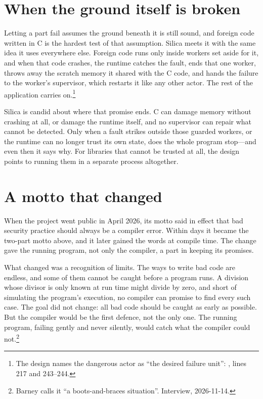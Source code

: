 \section{When the ground itself is broken}

Letting a part fail assumes the ground beneath it is still sound, and foreign
code written in C is the hardest test of that assumption. Silica meets it with
the same idea it uses everywhere else. Foreign code runs only inside workers set
aside for it, and when that code crashes, the runtime catches the fault, ends
that one worker, throws away the scratch memory it shared with the C code, and
hands the failure to the worker's supervisor, which restarts it like any other
actor. The rest of the application carries on.\footnote{The design names the
dangerous actor as ``the desired failure unit'':
, lines
217 and 243--244.}

Silica is candid about where that promise ends. C can damage memory without
crashing at all, or damage the runtime itself, and no supervisor can repair
what cannot be detected. Only when a fault strikes outside those guarded
workers, or the runtime can no longer trust its own state, does the whole
program stop---and even then it says why. For libraries that cannot be trusted
at all, the design points to running them in a separate process altogether.


\section{A motto that changed}

When the project went public in April 2026, its motto said in effect that bad
security practice should always be a compiler error. Within days it became the
two-part motto above, and it later gained the words at compile time. The change
gave the running program, not only the compiler, a part in keeping its
promises.

What changed was a recognition of limits. The ways to write bad code are
endless, and some of them cannot be caught before a program runs. A division
whose divisor is only known at run time might divide by zero, and short of
simulating the program's execution, no compiler can promise to find every such
case. The goal did not change: all bad code should be caught as early as
possible. But the compiler would be the first defence, not the only one. The
running program, failing gently and never silently, would catch what the
compiler could not.\footnote{Barney calls it ``a boots-and-braces situation''.
Interview, 2026-11-14.}

